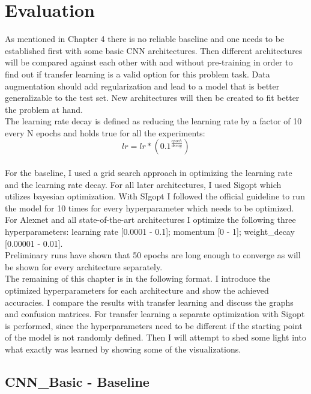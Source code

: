 \chapter{Evaluation}

As mentioned in Chapter 4 there is no reliable baseline and one needs to be established first with some basic CNN architectures. Then different architectures will be compared against each other with and without pre-training in order to find out if transfer learning is a valid option for this problem task. Data augmentation should add regularization and lead to a model that is better generalizable to the test set. New architectures will then be created to fit better the problem at hand. \\

The learning rate decay is defined as reducing the learning rate by a factor of 10 every N epochs and holds true for all the experiments: \\

\[ lr = lr * (0.1^{\frac{epoch}{decay}}) \] \\

For the baseline, I used a grid search approach in optimizing the learning rate and the learning rate decay. For all later architectures, I used Sigopt which utilizes bayesian optimization. With SIgopt I followed the official guideline to run the model for 10 times for every hyperparameter which needs to be optimized. For Alexnet and all state-of-the-art architectures I optimize the following three hyperparameters: learning rate [0.0001 - 0.1]; momentum [0 - 1]; weight\_decay [0.00001 - 0.01]. \\

Preliminary runs have shown that 50 epochs are long enough to converge as will be shown for every architecture separately. \\

The remaining of this chapter is in the following format. I introduce the optimized hyperparameters for each architecture and show the achieved accuracies. I compare the results with transfer learning and discuss the graphs and confusion matrices. For transfer learning a separate optimization with Sigopt is performed, since the hyperparameters need to be different if the starting point of the model is not randomly defined. Then I will attempt to shed some light into what exactly was learned by showing some of the visualizations.

\section{CNN\_Basic - Baseline}

